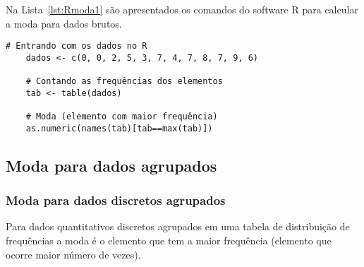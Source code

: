\documentclass[11pt,fleqn]{book} %
\begin{document}
\vspace{0,3cm}

Na Lista~\ref{lst:Rmoda1} são apresentados os comandos do software R para calcular a moda para dados brutos. \\

\begin{scriptsize}
	\estiloR
	\begin{lstlisting}[caption={Comandos do software R}, label=lst:Rmoda1]
	# Entrando com os dados no R
	dados <- c(0, 0, 2, 5, 3, 7, 4, 7, 8, 7, 9, 6)

	# Contando as frequências dos elementos
	tab <- table(dados)

	# Moda (elemento com maior frequência)
	as.numeric(names(tab)[tab==max(tab)])

	\end{lstlisting}
\end{scriptsize}



\subsection{Moda para dados agrupados}

\subsubsection{Moda para dados discretos agrupados}

Para dados quantitativos discretos agrupados em uma tabela de distribuição de frequências a moda é o elemento que tem a maior frequência (elemento que ocorre maior número de vezes). \\
\end{document}
